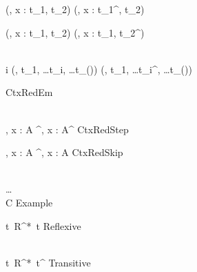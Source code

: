 
\Rule{\BinderOneReduction}
    {
    }
    {(\kappa, x : t_1, t_2) \betared {}(\kappa, x : t_1^\prime, t_2) }
    {}

\Rule{\BinderTwoReduction}
    {
    }
    {(\kappa, x : t_1, t_2) \betared {}(\kappa, x : t_1, t_2^\prime) }
    {}

\Rule{\ConstructorReduction}
    {
         \\
        i 
    }
    {(\kappa, t_1, \ldots t_i, \ldots t_{(\kappa)}) \betared {}(\kappa, t_1, \ldots t_i^\prime, \ldots t_{(\kappa)}) }
    {}

\Rule{\ContextReductionEmpty}
    {
    }
    {\varepsilon \betared \varepsilon}
    {CtxRedEm}

\Rule{\ContextReductionStep}
    {
         \\
    }
    {\Gamma, x : A \betared \Gamma^\prime, x : A^\prime}
    {CtxRedStep}

\Rule{\ContextReductionSkip}
    {
    }
    {\Gamma, x : A \betared \Gamma^\prime, x : A}
    {CtxRedSkip}

\Rule{\ExampleRule}
    {
        \\ \ldots
        \\ 
    }
    {C}
    {Example}

\Rule{\MultiRefl}
    {\color{white}{\_}}
    {t\ R^*\ t}
    {Reflexive}

\Rule{\MultiStep}
    {
         \\
    }
    {t\ R^*\ t^{\prime\prime}}
    {Transitive}
